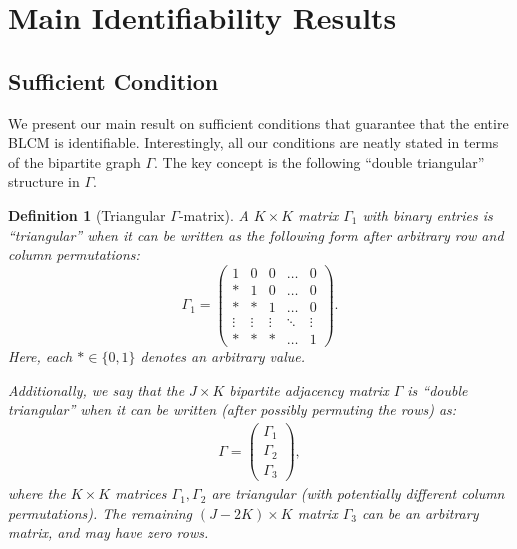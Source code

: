 \documentclass[10pt]{article} %
\newtheorem{definition}{Definition}
\begin{document}
%





\section{Main Identifiability Results}\label{sec:main result}
\subsection{Sufficient Condition}
We present our main result on sufficient conditions that guarantee that the entire BLCM is identifiable. Interestingly, all our conditions are neatly stated in terms of the bipartite graph $\Gamma$. The key concept is the following ``double triangular'' structure in $\Gamma$.

\begin{definition}[Triangular $\Gamma$-matrix]\label{def:triangular}
    A $K \times K$ matrix $\Gamma_1$ with binary entries is ``triangular'' when it can be written as the following form \emph{after arbitrary row and column permutations}:
    \begin{equation}\label{eq:triangular gamma}
        \Gamma_1 = \begin{pmatrix}
        1 & 0 & 0 & \ldots & 0 \\
        * & 1 & 0 & \ldots & 0 \\
        * & * & 1 & \ldots & 0 \\
        \vdots & \vdots & \vdots & \ddots & \vdots \\
        * & * & * & \ldots & 1
    \end{pmatrix}.
    \end{equation}
    Here, each $* \in \{0,1\}$ denotes an arbitrary value.

    Additionally, we say that the $J \times K$ bipartite adjacency matrix $\Gamma$ is ``double triangular'' when it can be written (after possibly permuting the rows) as:
    \begin{align}\label{eq:double triangular}
        \Gamma = \begin{pmatrix}
        \Gamma_1 \\ \Gamma_2 \\ \Gamma_3
    \end{pmatrix},
    \end{align}
    where the $K \times K$ matrices $\Gamma_1, \Gamma_2$ are triangular (with potentially \emph{different column permutations}). %
     The remaining $(J - 2K) \times K$ matrix $\Gamma_3$ can be an arbitrary matrix, and may have zero rows.
\end{definition}
\end{document}
